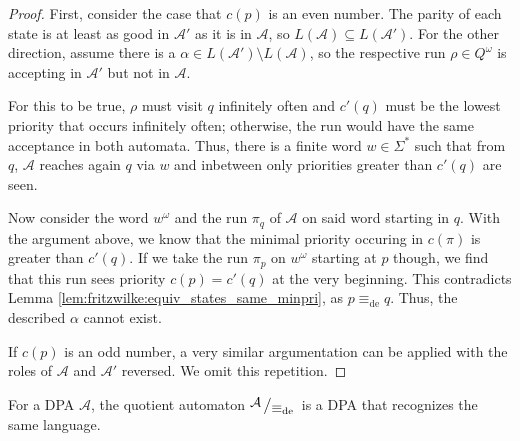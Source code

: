 \begin{proof}
	First, consider the case that $c(p)$ is an even number. The parity of each state is at least as good in $\mathcal{A}'$ as it is in $\mathcal{A}$, so $L(\mathcal{A}) \subseteq L(\mathcal{A}')$. For the other direction, assume there is a $\alpha \in L(\mathcal{A}') \setminus L(\mathcal{A})$, so the respective run $\rho \in Q^\omega$ is accepting in $\mathcal{A}'$ but not in $\mathcal{A}$. 
	
	For this to be true, $\rho$ must visit $q$ infinitely often and $c'(q)$ must be the lowest priority that occurs infinitely often; otherwise, the run would have the same acceptance in both automata. Thus, there is a finite word $w \in \Sigma^*$ such that from $q$, $\mathcal{A}$ reaches again $q$ via $w$ and inbetween only priorities greater than $c'(q)$ are seen.
	
	Now consider the word $w^\omega$ and the run $\pi_q$ of $\mathcal{A}$ on said word starting in $q$. With the argument above, we know that the minimal priority occuring in $c(\pi)$ is greater than $c'(q)$. If we take the run $\pi_p$ on $w^\omega$ starting at $p$ though, we find that this run sees priority $c(p) = c'(q)$ at the very beginning. This contradicts Lemma \ref{lem:fritzwilke:equiv_states_same_minpri}, as $p \equiv_\text{de} q$. Thus, the described $\alpha$ cannot exist. 
	
	If $c(p)$ is an odd number, a very similar argumentation can be applied with the roles of $\mathcal{A}$ and $\mathcal{A}'$ reversed. We omit this repetition.
\end{proof}

\begin{cor}
	For a DPA $\mathcal{A}$, the quotient automaton $\bigslant{\mathcal{A}}{\equiv_\text{de}}$ is a DPA that recognizes the same language.
\end{cor}










